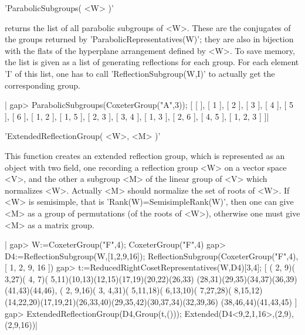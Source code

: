 'ParabolicSubgroups( <W> )'

returns  the  list  of  all  parabolic  subgroups  of  <W>.  These  are the
conjugates  of the  groups returned  by 'ParabolicRepresentatives(W)'; they
are  also in bijection with the flats of the hyperplane arrangement defined
by  <W>.  To  save  memory,  the  list  is  given  as  a list of generating
reflections  for each group. For each element  'I' of this list, one has to
call 'ReflectionSubgroup(W,I)' to actually get the corresponding group.

|    gap> ParabolicSubgroups(CoxeterGroup("A",3));
    [ [  ], [ 1 ], [ 2 ], [ 3 ], [ 4 ], [ 5 ], [ 6 ], [ 1, 2 ], [ 1, 5 ],
      [ 2, 3 ], [ 3, 4 ], [ 1, 3 ], [ 2, 6 ], [ 4, 5 ], [ 1, 2, 3 ] ]|


'ExtendedReflectionGroup( <W>, <M> )'

This function creates an extended reflection group, which is represented as
an  object with two field, one recording a reflection group <W> on a vector
space  <V>, and the other  a subgroup <M> of  the linear group of <V> which
normalizes  <W>. Actually <M> should normalize the  set of roots of <W>. If
<W>  is semisimple, that is  'Rank(W)=SemisimpleRank(W)', then one can give
<M>  as a group of  permutations (of the roots  of <W>), otherwise one must
give <M> as a matrix group.

|    gap> W:=CoxeterGroup("F",4);
    CoxeterGroup("F",4)
    gap> D4:=ReflectionSubgroup(W,[1,2,9,16]);
    ReflectionSubgroup(CoxeterGroup("F",4), [ 1, 2, 9, 16 ])
    gap> t:=ReducedRightCosetRepresentatives(W,D4){[3,4]};
    [ ( 2, 9)( 3,27)( 4, 7)( 5,11)(10,13)(12,15)(17,19)(20,22)(26,33)
        (28,31)(29,35)(34,37)(36,39)(41,43)(44,46),
      ( 2, 9,16)( 3, 4,31)( 5,11,18)( 6,13,10)( 7,27,28)( 8,15,12)
        (14,22,20)(17,19,21)(26,33,40)(29,35,42)(30,37,34)(32,39,36)
        (38,46,44)(41,43,45) ]
    gap> ExtendedReflectionGroup(D4,Group(t,()));
    Extended(D4<9,2,1,16>,(2,9),(2,9,16))|

